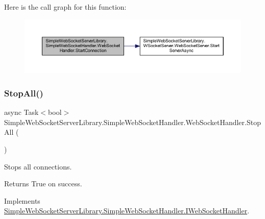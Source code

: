 Here is the call graph for this function\+:
\nopagebreak
\begin{figure}[H]
\begin{center}
\leavevmode
\includegraphics[width=350pt]{class_simple_web_socket_server_library_1_1_simple_web_socket_handler_1_1_web_socket_handler_aab85fcebece3958e4308996b57415bd5_cgraph}
\end{center}
\end{figure}
\mbox{\label{class_simple_web_socket_server_library_1_1_simple_web_socket_handler_1_1_web_socket_handler_acd6bdfe5797bdacb39730f83bafde6fc}} 
\subsubsection{\texorpdfstring{Stop\+All()}{StopAll()}\hspace{0.1cm}{\footnotesize\ttfamily [1/2]}}
{\footnotesize\ttfamily async Task$<$bool$>$ Simple\+Web\+Socket\+Server\+Library.\+Simple\+Web\+Socket\+Handler.\+Web\+Socket\+Handler.\+Stop\+All (\begin{DoxyParamCaption}{ }\end{DoxyParamCaption})}



Stops all connections. 

\begin{DoxyReturn}{Returns}
True on success.
\end{DoxyReturn}


Implements \mbox{\hyperlink{interface_simple_web_socket_server_library_1_1_simple_web_socket_handler_1_1_i_web_socket_handler_a9320e5c10e5afa670c1377b5c0e2f762}{Simple\+Web\+Socket\+Server\+Library.\+Simple\+Web\+Socket\+Handler.\+I\+Web\+Socket\+Handler}}.



